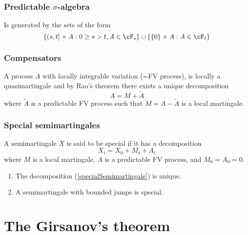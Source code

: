 \begin{frame}
    \frametitle{Predictable $\sigma$-algebra}
    
    Is generated by the sets of the form
    \begin{equation}
        \left\{ (s,t]\times A : 0\geq s>t, A\in\cF_s \right\} \cup 
        \left\{ \left\{ 0 \right\} \times A : A\in\cF_t \right\}
    \end{equation}

\end{frame}

\begin{frame}
    \frametitle{Compensators}
    
    A process $A$ with locally integrable variation (=FV process), is 
    locally a quasimartingale and by Rao's theorem there exists a unique decomposition
    \begin{equation}
        A = M + \tilde A
    \end{equation}
    where $\tilde A$ is a predictable FV process such that $M=A-\tilde A$ is a local martingale.
\end{frame}




\begin{frame}
    \frametitle{Special semimartingales}
    
    A semimartingale $X$ is said to be special if it has a 
    decomposition 
    \begin{equation}
        X_t = X_0 + M_t + A_t
        \label{specialSemimartingale}
    \end{equation}
    where $M$ is a local martingale, $A$ is a predictable FV process, and $M_0=A_0=0$.

    \begin{enumerate}
        \item The decomposition (\ref{specialSemimartingale}) is unique.
        \item A semimartingale with bounded jumps is special.
    \end{enumerate}
\end{frame}



\section{The Girsanov's theorem}

